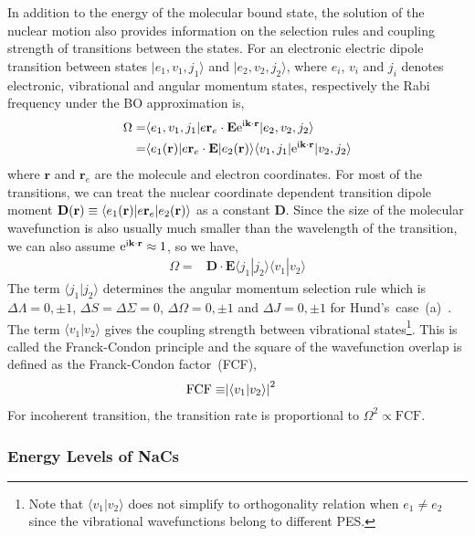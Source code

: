 In addition to the energy of the molecular bound state,
the solution of the nuclear motion also provides information on the selection rules
and coupling strength of transitions between the states.
For an electronic electric dipole transition between states
$|e_1,v_1,j_1\rangle$ and $|e_2,v_2,j_2\rangle$,
where $e_i$, $v_i$ and $j_i$ denotes electronic, vibrational and angular momentum states,
respectively the Rabi frequency under the BO approximation is,
\begin{align*}
  \Omega=&\langle e_1,v_1,j_1|e\mathbf{r}_e\cdot\mathbf{E}\mathrm{e}^{\mathrm{i}\mathbf{k}\cdot\mathbf{r}}|e_2,v_2,j_2\rangle\\
  =&\langle e_1(\mathbf{r})|e\mathbf{r}_e\cdot\mathbf{E}|e_2(\mathbf{r})\rangle\langle v_1,j_1|\mathrm{e}^{\mathrm{i}\mathbf{k}\cdot\mathbf{r}}|v_2,j_2\rangle
\end{align*}
where $\mathbf{r}$ and $\mathbf{r}_e$ are the molecule and electron coordinates.
For most of the transitions, we can treat the nuclear coordinate dependent transition dipole
moment $\mathbf{D}{\left({\mathbf{r}}\right)}\equiv\langle e_1(\mathbf{r})|e\mathbf{r}_e|e_2(\mathbf{r})\rangle$ as a constant $\mathbf{D}$.
Since the size of the molecular wavefunction is also usually much smaller than
the wavelength of the transition, we can also assume $\mathrm{e}^{\mathrm{i}\mathbf{k}\cdot\mathbf{r}}\approx 1$,
so we have,
\begin{align*}
  \Omega=&\mathbf{D}\cdot\mathbf{E}\langle j_1|j_2\rangle\langle v_1|v_2\rangle
\end{align*}
The term $\langle j_1|j_2\rangle$ determines the angular momentum selection rule which is
$\Delta\Lambda=0,\pm1$, $\Delta S=\Delta\Sigma=0$, $\Delta\Omega=0,\pm1$ and $\Delta J=0,\pm1$
for Hund's~case~(a)~\cite[p.~14-15]{straughan_spectroscopy_1976}.
The term $\langle v_1|v_2\rangle$ gives the coupling strength between vibrational states\footnote{
  Note that $\langle v_1|v_2\rangle$ does not simplify to orthogonality relation
  when $e_1\neq e_2$ since the vibrational wavefunctions belong to different PES.}.
This is called the Franck-Condon principle and the square of the wavefunction overlap
is defined as the Franck-Condon factor~(FCF),
\begin{align*}
  \mathrm{FCF}\equiv&{\left|{\langle v_1|v_2\rangle}\right|}^2
\end{align*}
For incoherent transition, the transition rate is proportional to $\Omega^2\propto\mathrm{FCF}$.

\subsubsection{Energy Levels of NaCs}

